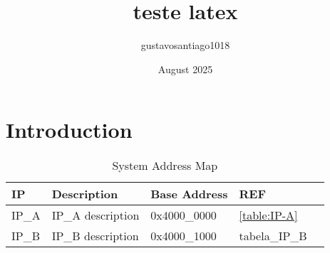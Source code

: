 \documentclass{article}
\title{teste latex}
\author{gustavosantiago1018 }
\date{August 2025}
\begin{document}
\maketitle

\section{Introduction}


\begin{table}[h]
\centering
\caption{System Address Map}
\label{table:system_address_map}
\begin{tabular}{|l|l|l|l|l|}
\hline
\textbf{IP} & \textbf{Description} & \textbf{Base Address} & \textbf{REF} \\ \hline
IP\_A & IP\_A description & 0x4000\_0000  & \ref{table:IP-A} \\ \hline
IP\_B & IP\_B description & 0x4000\_1000  & tabela\_IP\_B \\ \hline
\end{tabular}
\end{table}
\end{document}
